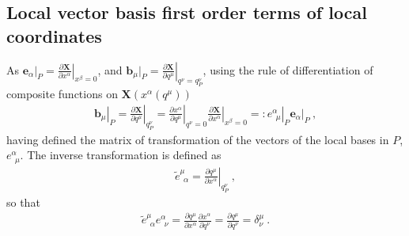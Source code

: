 \documentclass[letterpaper,10pt,english]{jupyterBook}
\begin{document}
\subsection{Local vector basis \sphinxhyphen{} first order terms of local coordinates}
\label{\detokenize{ch/relativity-general/local-inertial-reference-frame-and-equivalence-principle:local-vector-basis-first-order-terms-of-local-coordinates}}\label{\detokenize{ch/relativity-general/local-inertial-reference-frame-and-equivalence-principle:general-relativity-local-inertial-reference-frame-local-basis}}
\sphinxAtStartPar
{} As \(\mathbf{e}_{\alpha}|_P = \left.\tfrac{\partial \mathbf{X}}{\partial x^\alpha}\right|_{x^\beta = 0}\), and \(\mathbf{b}_{\mu}|_P = \left.\tfrac{\partial \mathbf{X}}{\partial q^\mu}\right|_{q^{\nu}=q^{\nu}_P}\), using the rule of differentiation of composite functions on \(\mathbf{X}(x^\alpha(q^\mu))\)
\begin{equation*}
\begin{split}\left.\mathbf{b}_{\mu}\right|_P = \left.\frac{\partial \mathbf{X}}{\partial q^{\mu}}\right|_{q^{\nu}_P} = \left.\frac{\partial x^{\alpha}}{\partial q^{\mu}}\right|_{q^\nu=0} \left.\frac{\partial \mathbf{X}}{\partial x^{\alpha}}\right|_{x^\beta=0} =:\left. e^{\alpha}_{\ \ \mu} \right|_P \left.\mathbf{e}_{\alpha}\right|_P \ ,\end{split}
\end{equation*}
\sphinxAtStartPar
having defined the matrix of transformation of the vectors of the local bases in \(P\), \(e^{\alpha}_{\ \ \mu}\). The inverse transformation is defined as
\begin{equation}\label{equation:ch/relativity-general/local-inertial-reference-frame-and-equivalence-principle:eq:local-inertial:basis-transformation:inverse}
\begin{split}\widetilde{e}^{\mu}_{\ \ \alpha} = \left. \frac{\partial q^{\mu}}{\partial x^{\alpha}} \right|_{q^{\nu}_P} \ ,\end{split}
\end{equation}
\sphinxAtStartPar
so that
\begin{equation*}
\begin{split}\widetilde{e}^{\mu}_{\ \ \alpha} e^{\alpha}_{\ \ \nu} = \frac{\partial q^{\mu}}{\partial x^{\alpha}} \frac{\partial x^{\alpha}}{\partial q^{\nu}} = \frac{\partial q^{\mu}}{\partial q^{\nu}} = \delta^{\mu}_{\nu} \ . \end{split}
\end{equation*}
\sphinxAtStartPar
\end{document}
